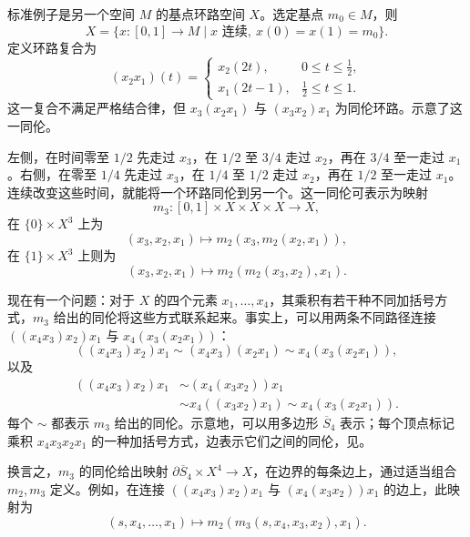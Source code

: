 标准例子是另一个空间 $M$ 的基点环路空间 $X$。选定基点 $m_0\in M$，则
\[
X=\{x\colon[0,1]\to M\mid x\text{ 连续},\ x(0)=x(1)=m_0\}.
\]
定义环路复合为
\[
(x_2x_1)(t)=\begin{cases}
x_2(2t),&0\leq t\leq\tfrac12,\\
x_1(2t-1),&\tfrac12\leq t\leq1.
\end{cases}
\]
这一复合不满足严格结合律，但 $x_3(x_2x_1)$ 与 $(x_3x_2)x_1$ 为同伦环路。示意了这一同伦。
\begin{figure}[H]
\centering
{}
\BookNumberOnlyCaption\label{fig:8.1}
\end{figure}

左侧，在时间零至 $1/2$ 先走过 $x_3$，在 $1/2$ 至 $3/4$ 走过 $x_2$，再在 $3/4$ 至一走过 $x_1$。右侧，在零至 $1/4$ 先走过 $x_3$，在 $1/4$ 至 $1/2$ 走过 $x_2$，再在 $1/2$ 至一走过 $x_1$。连续改变这些时间，就能将一个环路同伦到另一个。这一同伦可表示为映射
\[
m_3\colon[0,1]\times X\times X\times X\longrightarrow X,
\]
在 $\{0\}\times X^3$ 上为
\[
(x_3,x_2,x_1)\longmapsto m_2(x_3,m_2(x_2,x_1)),
\]
在 $\{1\}\times X^3$ 上则为
\[
(x_3,x_2,x_1)\longmapsto m_2(m_2(x_3,x_2),x_1).
\]

现在有一个问题：对于 $X$ 的四个元素 $x_1,\ldots,x_4$，其乘积有若干种不同加括号方式，$m_3$ 给出的同伦将这些方式联系起来。事实上，可以用两条不同路径连接 $((x_4x_3)x_2)x_1$ 与 $x_4(x_3(x_2x_1))$：
\[
((x_4x_3)x_2)x_1\sim(x_4x_3)(x_2x_1)\sim x_4(x_3(x_2x_1)),
\]
以及
\[
\begin{aligned}
((x_4x_3)x_2)x_1
&\sim(x_4(x_3x_2))x_1\\
&\sim x_4((x_3x_2)x_1)\sim x_4(x_3(x_2x_1)).
\end{aligned}
\]
每个 $\sim$ 都表示 $m_3$ 给出的同伦。示意地，可以用多边形 $\overline S_4$ 表示；每个顶点标记乘积 $x_4x_3x_2x_1$ 的一种加括号方式，边表示它们之间的同伦，见。
\begin{figure}[H]
\centering
{}
\BookNumberOnlyCaption\label{fig:8.2}
\end{figure}

换言之，$m_3$ 的同伦给出映射 $\partial\overline S_4\times X^4\to X$，在边界的每条边上，通过适当组合 $m_2,m_3$ 定义。例如，在连接 $((x_4x_3)x_2)x_1$ 与 $(x_4(x_3x_2))x_1$ 的边上，此映射为
\[
(s,x_4,\ldots,x_1)\longmapsto m_2(m_3(s,x_4,x_3,x_2),x_1).
\]

